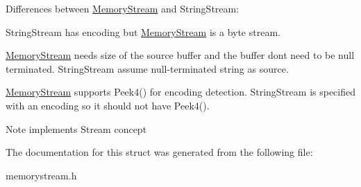 Differences between \hyperlink{a02296}{Memory\+Stream} and String\+Stream\+:
\begin{DoxyEnumerate}
\item String\+Stream has encoding but \hyperlink{a02296}{Memory\+Stream} is a byte stream.
\item \hyperlink{a02296}{Memory\+Stream} needs size of the source buffer and the buffer don\textquotesingle{}t need to be null terminated. String\+Stream assume null-\/terminated string as source.
\item \hyperlink{a02296}{Memory\+Stream} supports Peek4() for encoding detection. String\+Stream is specified with an encoding so it should not have Peek4(). \begin{DoxyNote}{Note}
implements Stream concept 
\end{DoxyNote}

\end{DoxyEnumerate}

The documentation for this struct was generated from the following file\+:\begin{DoxyCompactItemize}
\item 
memorystream.\+h\end{DoxyCompactItemize}

